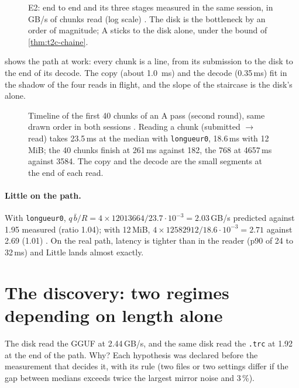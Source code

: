 \begin{figure}[ht]
\centering
\GrapheChmEtages
\caption[E2: the stages]{E2: end to end and its three stages measured in the same session, in GB/s of chunks read (log scale) \mes. The disk is the bottleneck by an order of magnitude; A sticks to the disk alone, under the bound of \cref{thm:t2c-chaine}.}
\label{fig:t2c-etages}
\end{figure}

 shows the path at work: every chunk is a line, from its submission to the disk to the end of its decode. The copy (about \SI{1.0}{\milli\second}) and the decode (0.35\,ms) fit in the shadow of the four reads in flight, and the slope of the staircase is the disk's alone.

\begin{figure}[ht]
\centering
\GrapheChmChrono
\caption[E2: timeline of the first 40 chunks]{Timeline of the first 40 chunks of an A pass (second round), same drawn order in both sessions \mes. Reading a chunk (submitted $\to$ read) takes 23.5\,ms at the median with \texttt{longueur0}, 18.6\,ms with 12\,MiB; the 40 chunks finish at 261\,ms against 182, the 768 at \num{4657}\,ms against \num{3584}. The copy and the decode are the small segments at the end of each read.}
\label{fig:t2c-chrono}
\end{figure}

\paragraph{Little on the path.} With \texttt{longueur0}, $q\,\bar b/R = 4 \times \num{12013664} / 23.7\cdot10^{-3} = 2.03$\,GB/s predicted against 1.95 measured (ratio 1.04); with 12\,MiB, $4 \times \num{12582912} / 18.6\cdot10^{-3} = 2.71$ against 2.69 (1.01) \calc. On the real path, latency is tighter than in the reader (p90 of 24 to 32\,ms) and Little lands almost exactly.

\section{The discovery: two regimes depending on length alone}\label{sec:t2c-regimes}

The disk read the GGUF at 2.44\,GB/s, and the same disk read the \texttt{.trc} at 1.92 at the end of the path. Why? Each hypothesis was declared before the measurement that decides it, with its rule (two files or two settings differ if the gap between medians exceeds twice the largest mirror noise and 3\,\%).

